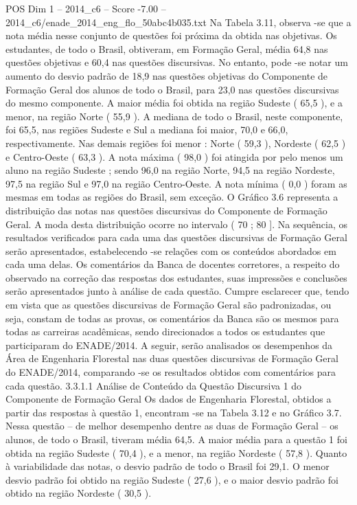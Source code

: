 \begin{textsample}{POS Dim 1 – 2014\_c6 – Score -7.00 – 2014\_c6/enade\_2014\_eng\_flo\_50abc4b035.txt}
Na Tabela 3.11, observa -se que a nota média nesse conjunto de questões foi próxima da obtida nas objetivas.
Os estudantes, de todo o Brasil, obtiveram, em Formação Geral, média 64,8 nas questões objetivas e 60,4 nas questões discursivas.
No entanto, pode -se notar um aumento do desvio padrão de 18,9 nas questões objetivas do Componente de Formação Geral dos alunos de todo o Brasil, para 23,0 nas questões discursivas do mesmo componente.
A maior média foi obtida na região Sudeste ( 65,5 ), e a menor, na região Norte ( 55,9 ).
A mediana de todo o Brasil, neste componente, foi 65,5, nas regiões Sudeste e Sul a mediana foi maior, 70,0 e 66,0, respectivamente.
Nas demais regiões foi menor : Norte ( 59,3 ), Nordeste ( 62,5 ) e Centro-Oeste ( 63,3 ).
A nota máxima ( 98,0 ) foi atingida por pelo menos um aluno na região Sudeste ; sendo 96,0 na região Norte, 94,5 na região Nordeste, 97,5 na região Sul e 97,0 na região Centro-Oeste.
A nota mínima ( 0,0 ) foram as mesmas em todas as regiões do Brasil, sem exceção.
O Gráfico 3.6 representa a distribuição das notas nas questões discursivas do Componente de Formação Geral.
A moda desta distribuição ocorre no intervalo ( 70 ; 80 ].
Na sequência, os resultados verificados para cada uma das questões discursivas de Formação Geral serão apresentados, estabelecendo -se relações com os conteúdos abordados em cada uma delas.
Os comentários da Banca de docentes corretores, a respeito do observado na correção das respostas dos estudantes, suas impressões e conclusões serão apresentados junto à análise de cada questão.
Cumpre esclarecer que, tendo em vista que as questões discursivas de Formação Geral são padronizadas, ou seja, constam de todas as provas, os comentários da Banca são os mesmos para todas as carreiras acadêmicas, sendo direcionados a todos os estudantes que participaram do ENADE/2014.
A seguir, serão analisados os desempenhos da Área de Engenharia Florestal nas duas questões discursivas de Formação Geral do ENADE/2014, comparando -se os resultados obtidos com comentários para cada questão. 3.3.1.1 Análise de Conteúdo da Questão Discursiva 1 do Componente de Formação Geral Os dados de Engenharia Florestal, obtidos a partir das respostas à questão 1, encontram -se na Tabela 3.12 e no Gráfico 3.7.
Nessa questão – de melhor desempenho dentre as duas de Formação Geral – os alunos, de todo o Brasil, tiveram média 64,5.
A maior média para a questão 1 foi obtida na região Sudeste ( 70,4 ), e a menor, na região Nordeste ( 57,8 ).
Quanto à variabilidade das notas, o desvio padrão de todo o Brasil foi 29,1.
O menor desvio padrão foi obtido na região Sudeste ( 27,6 ), e o maior desvio padrão foi obtido na região Nordeste ( 30,5 ).

\end{textsample}
